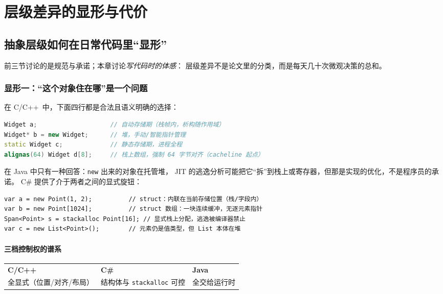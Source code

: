 \documentclass[12pt,a4paper,fontset=fandol]{ctexbook}
\newcommand{\Cplus}[1]{C++\,#1}
\begin{document}
\part{层级差异的显形与代价}

\chapter{抽象层级如何在日常代码里``显形''}

前三节讨论的是规范与承诺；本章讨论\emph{写代码时的体感}：
层级差异不是论文里的分类，而是每天几十次微观决策的总和。

\section{显形一：``这个对象住在哪''是一个问题}

在 C/\allowbreak{}\Cplus{} 中，下面四行都是合法且语义明确的选择：

\begin{lstlisting}[language=C++,caption={C++：同一类型的四种居住方式}]
Widget a;                    // 自动存储期（栈帧内，析构随作用域）
Widget* b = new Widget;      // 堆，手动/智能指针管理
static Widget c;             // 静态存储期，进程全程
alignas(64) Widget d[8];     // 栈上数组，强制 64 字节对齐（cacheline 起点）
\end{lstlisting}

在 Java 中只有一种回答：\texttt{new} 出来的对象在托管堆，
JIT 的逃逸分析可能把它``拆''到栈上或寄存器，但那是实现的优化，不是程序员的承诺。
C\# 提供了介于两者之间的显式旋钮：

\begin{lstlisting}[style=csharpstyle,caption={C\#：值类型给出部分``居住权''}]
var a = new Point(1, 2);          // struct：内联在当前存储位置（栈/字段内）
var b = new Point[1024];          // struct 数组：一块连续缓冲，无逐元素指针
Span<Point> s = stackalloc Point[16]; // 显式栈上分配，逃逸被编译器禁止
var c = new List<Point>();        // 元素仍是值类型，但 List 本体在堆
\end{lstlisting}

\subsection*{三档控制权的谱系}

\begin{center}
\begin{tabular}{@{}l l l@{}}
\textbf{C/\allowbreak{}\Cplus{}} & \textbf{C\#} & \textbf{Java} \\
全显式（位置/对齐/布局） & 结构体与 \texttt{stackalloc} 可控 & 全交给运行时 \\
\end{tabular}
\end{center}
\end{document}
